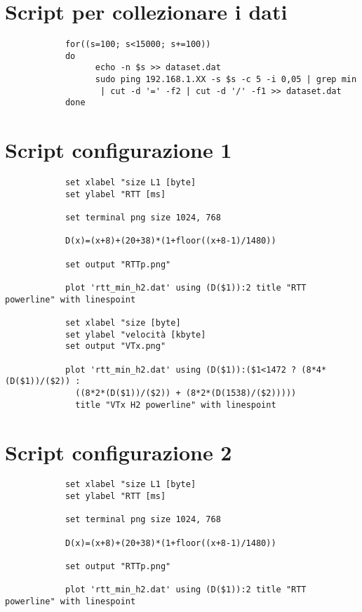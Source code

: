 \documentclass[../lab2.tex]{subfiles}
\begin{document}
\begin{appendices}
    \section{Script per collezionare i dati}
        \begin{verbatim}
            for((s=100; s<15000; s+=100))
            do
	              echo -n $s >> dataset.dat 
	              sudo ping 192.168.1.XX -s $s -c 5 -i 0,05 | grep min 
                   | cut -d '=' -f2 | cut -d '/' -f1 >> dataset.dat
            done
            \end{verbatim}
    \section{Script configurazione 1}
        \begin{verbatim}
            set xlabel "size L1 [byte]
            set ylabel "RTT [ms]

            set terminal png size 1024, 768

            D(x)=(x+8)+(20+38)*(1+floor((x+8-1)/1480))

            set output "RTTp.png"

            plot 'rtt_min_h2.dat' using (D($1)):2 title "RTT powerline" with linespoint

            set xlabel "size [byte]
            set ylabel "velocità [kbyte]
            set output "VTx.png"

            plot 'rtt_min_h2.dat' using (D($1)):($1<1472 ? (8*4*(D($1))/($2)) : 
              ((8*2*(D($1))/($2)) + (8*2*(D(1538)/($2)))))   
              title "VTx H2 powerline" with linespoint
        \end{verbatim}

    \section{Script configurazione 2}
        \begin{verbatim}
            set xlabel "size L1 [byte]
            set ylabel "RTT [ms]

            set terminal png size 1024, 768

            D(x)=(x+8)+(20+38)*(1+floor((x+8-1)/1480))

            set output "RTTp.png"

            plot 'rtt_min_h2.dat' using (D($1)):2 title "RTT powerline" with linespoint


\end{verbatim}
\end{appendices}
\end{document}
